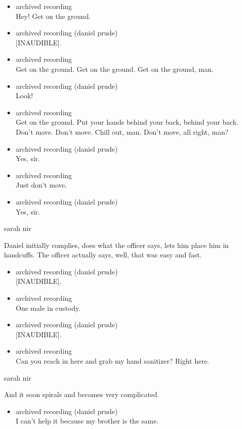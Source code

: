 \begin{itemize}
\item
  archived recording\\
  Hey! Get on the ground.
\item
  archived recording (daniel prude)\\
  {[}INAUDIBLE{]}.
\item
  archived recording\\
  Get on the ground. Get on the ground. Get on the ground, man.
\item
  archived recording (daniel prude)\\
  Look!
\item
  archived recording\\
  Get on the ground. Put your hands behind your back, behind your back.
  Don't move. Don't move. Chill out, man. Don't move, all right, man?
\item
  archived recording (daniel prude)\\
  Yes, sir.
\item
  archived recording\\
  Just don't move.
\item
  archived recording (daniel prude)\\
  Yes, sir.
\end{itemize}

sarah nir

Daniel initially complies, does what the officer says, lets him place
him in handcuffs. The officer actually says, well, that was easy and
fast.

\begin{itemize}
\item
  archived recording (daniel prude)\\
  {[}INAUDIBLE{]}.
\item
  archived recording\\
  One male in custody.
\item
  archived recording (daniel prude)\\
  {[}INAUDIBLE{]}.
\item
  archived recording\\
  Can you reach in here and grab my hand sanitizer? Right here.
\end{itemize}

sarah nir

And it soon spirals and becomes very complicated.

\begin{itemize}
\tightlist
\item
  archived recording (daniel prude)\\
  I can't help it because my brother is the same.
\end{itemize}

